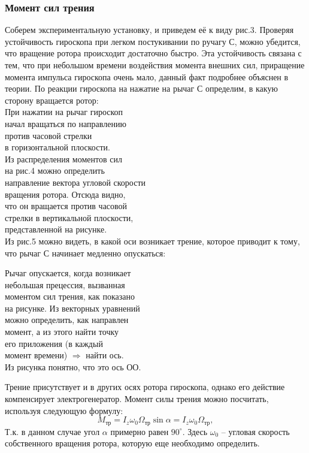 \documentclass[a4paper, 12pt]{article}%
\begin{document}
\subsubsection{Момент сил трения}
Соберем экспериментальную установку, и приведем её к виду рис.3. Проверяя устойчивость гироскопа при легком постукивании по ручагу С, можно убедится, что вращение ротора происходит достаточно быстро. Эта устойчивость связана с тем, что при небольшом времени воздействия момента внешних сил, приращение момента импульса гироскопа очень мало, данный факт подробнее объяснен в теории. По реакции гироскопа на нажатие на рычаг С определим, в какую сторону вращается ротор:\\
При нажатии на рычаг гироскоп \\ начал вращаться по направлению \\ против часовой стрелки \\ в горизонтальной плоскости.\\ Из распределения моментов сил\\ на рис.4 можно определить \\ направление вектора угловой скорости \\ вращения ротора. Отсюда видно,\\ что он вращается против часовой\\ стрелки в вертикальной плоскости,\\ представленной на рисунке.\\
Из рис.5 можно видеть, в какой оси возникает трение, которое приводит к тому, что рычаг С начинает медленно опускаться:
\begin{flushright}
Рычаг опускается, когда возникает \\небольшая прецессия, вызванная\\ моментом сил трения, как показано \\на рисунке. Из векторных уравнений\\ можно определить, как направлен\\ момент, а из этого найти точку\\ его приложения (в каждый \\момент времени) $\Rightarrow$ найти ось.\\Из рисунка понятно, что это ось ОО.
\end{flushright}
Трение присутствует и в других осях ротора гироскопа, однако его действие компенсирует электрогенератор. Момент силы трения можно посчитать, используя следующую формулу:
\begin{equation}
M_{\text{тр}}=I_z\omega_0\Omega_{\text{тр}}\sin{\alpha}=I_z\omega_0\Omega_{\text{тр}},
\end{equation}
Т.к. в данном случае угол $\alpha$ примерно равен $90^{\circ}$. Здесь $\omega_0$ -- угловая скорость собственного вращения ротора, которую еще необходимо определить.
\end{document}
